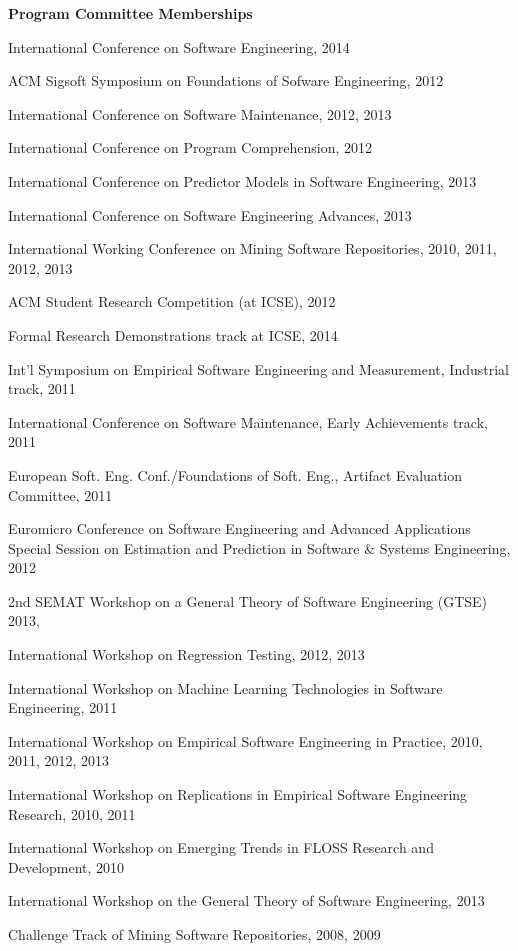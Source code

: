 \documentclass[margin,line,article,letterpaper]{res}
\newenvironment{list1}{
  \begin{list}{}{%
      \setlength{\itemsep}{0in}
      \setlength{\parsep}{0in} \setlength{\parskip}{0in}
      \setlength{\topsep}{0in} \setlength{\partopsep}{0in} 
      \setlength{\leftmargin}{0.17in}}}{\end{list}}
\begin{document}
\begin{resume}
\textbf{Program Committee Memberships}
\begin{list1}
\item International Conference on Software Engineering, 2014
\item ACM Sigsoft Symposium on Foundations of Sofware Engineering, 2012
\item International Conference on Software Maintenance, 2012, 2013
\item International Conference on Program Comprehension, 2012
\item International Conference on Predictor Models in Software Engineering, 2013
\item International Conference on Software Engineering Advances, 2013
\item International Working Conference on Mining Software Repositories, 2010, 2011, 2012, 2013
\item ACM Student Research Competition (at ICSE), 2012
\item Formal Research Demonstrations track at ICSE, 2014
\item Int'l Symposium on Empirical Software Engineering and Measurement, Industrial track, 2011
\item International Conference on Software Maintenance, Early Achievements track, 2011
\item European Soft. Eng. Conf./Foundations of Soft. Eng., Artifact Evaluation Committee, 2011
\item Euromicro Conference on Software Engineering and Advanced Applications Special Session on Estimation and Prediction in Software \& Systems Engineering, 2012
\item 2nd SEMAT Workshop on a General Theory of Software Engineering (GTSE) 2013, 
\item International Workshop on Regression Testing, 2012, 2013
\item International Workshop on Machine Learning Technologies in Software Engineering, 2011
\item International Workshop on Empirical Software Engineering in Practice, 2010, 2011, 2012, 2013
\item International Workshop on Replications in Empirical Software Engineering Research, 2010, 2011
\item International Workshop on Emerging Trends in FLOSS Research and Development, 2010
\item International Workshop on the General Theory of Software Engineering, 2013
\item Challenge Track of Mining Software Repositories, 2008, 2009
\end{list1}


\end{resume}
\end{document}
